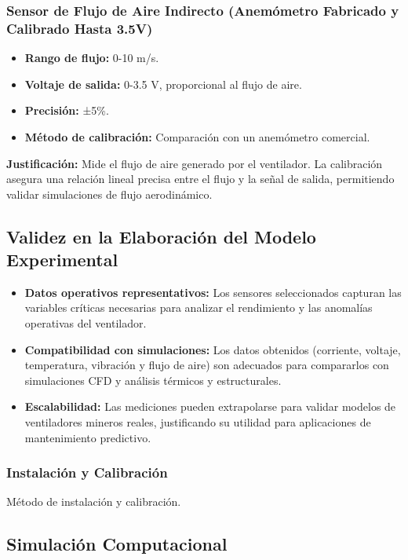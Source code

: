 \documentclass[journal,article,submit,pdftex,moreauthors]{Definitions/mdpi}
\begin{document}
\subsubsection{Sensor de Flujo de Aire Indirecto (Anemómetro Fabricado y Calibrado Hasta 3.5V)}
\begin{itemize}
    \item \textbf{Rango de flujo:} 0-10 m/s.
    \item \textbf{Voltaje de salida:} 0-3.5 V, proporcional al flujo de aire.
    \item \textbf{Precisión:} ±5\%.
    \item \textbf{Método de calibración:} Comparación con un anemómetro comercial.
\end{itemize}
\textbf{Justificación:} Mide el flujo de aire generado por el ventilador. La calibración asegura una relación lineal precisa entre el flujo y la señal de salida, permitiendo validar simulaciones de flujo aerodinámico.

\subsection{Validez en la Elaboración del Modelo Experimental}
\begin{itemize}
    \item \textbf{Datos operativos representativos:} Los sensores seleccionados capturan las variables críticas necesarias para analizar el rendimiento y las anomalías operativas del ventilador.
    \item \textbf{Compatibilidad con simulaciones:} Los datos obtenidos (corriente, voltaje, temperatura, vibración y flujo de aire) son adecuados para compararlos con simulaciones CFD y análisis térmicos y estructurales.
    \item \textbf{Escalabilidad:} Las mediciones pueden extrapolarse para validar modelos de ventiladores mineros reales, justificando su utilidad para aplicaciones de mantenimiento predictivo.
\end{itemize}

\subsubsection{Instalación y Calibración}
Método de instalación y calibración.

\subsection{Simulación Computacional}
\end{document}
